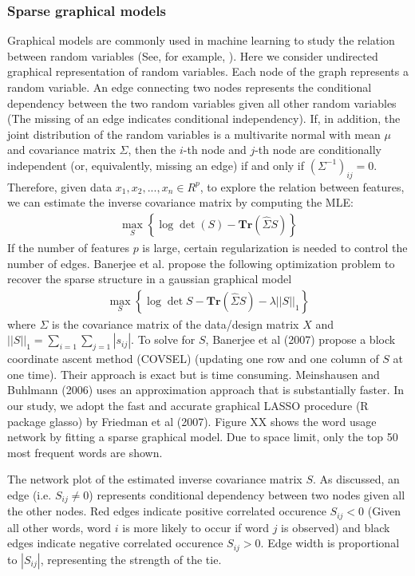 \documentclass[11pt]{article}
\newcommand{\1}[1]{{\mathbf 1}\left\{#1\right\}}        %
\def\lp{\left(}
\def\rp{\right)}
\begin{document}
\subsubsection{Sparse graphical models}
Graphical models are commonly used in machine learning to study the relation between random variables (See, for example, \cite{WainJordan}). Here we consider undirected graphical representation of random variables. Each node of the graph represents a random variable. An edge connecting two nodes represents the conditional dependency between the two random variables given all other random variables (The missing of an edge indicates conditional independency). If, in addition, the joint distribution of the random variables is a multivarite normal with mean $\mu$ and covariance matrix $\Sigma$, then the $i$-th node and $j$-th node are conditionally independent (or, equivalently, missing an edge) if and only if $(\Sigma^{-1})_{ij} = 0$. Therefore, given data $x_1,x_2,...,x_n\in R^p$, to explore the relation between features, we can estimate the inverse covariance matrix by computing the MLE:   
\begin{align}
\label{eq:mle}
\max_S \left\{  \log \det \lp S\rp - \textbf{Tr}( \hat{\Sigma}S)  \right\}
\end{align}
If the number of features $p$ is large, certain regularization is needed to control the number of edges. Banerjee et al. \cite{Banerjee} propose the following optimization problem to recover the sparse structure in a gaussian graphical model
\begin{align}
\label{eq:gLasso}
\max_S \left\{ \log \det S - \textbf{Tr} \lp \hat{\Sigma}S \rp - \lambda ||S||_1 \right\}
\end{align}
where $\Sigma$ is the covariance matrix of the data/design matrix $X$ and $||S||_1 = \sum_{i=1}\sum_{j=1} |s_{ij}|$. To solve for $S$, Banerjee et al (2007) propose a block coordinate ascent method (COVSEL) (updating one row and one column of $S$ at one time). Their approach is exact but is time consuming. Meinshausen and Buhlmann (2006) uses an approximation approach that is substantially faster. In our study, we adopt the fast and accurate graphical LASSO procedure (R package glasso) by Friedman et al (2007). Figure XX shows the word usage network by fitting a sparse graphical model. Due to space limit, only the top 50 most frequent words are shown.

The network plot of the estimated inverse covariance matrix $S$. As discussed, an edge (i.e. $S_{ij}\neq 0$) represents conditional dependency between two nodes given all the other nodes. Red edges indicate positive correlated occurence $S_{ij}<0$ (Given all other words, word $i$ is more likely to occur if word $j$ is observed) and black edges indicate negative correlated occurence $S_{ij}>0$. Edge width is proportional to $|S_{ij}|$, representing the strength of the tie.
\end{document}
